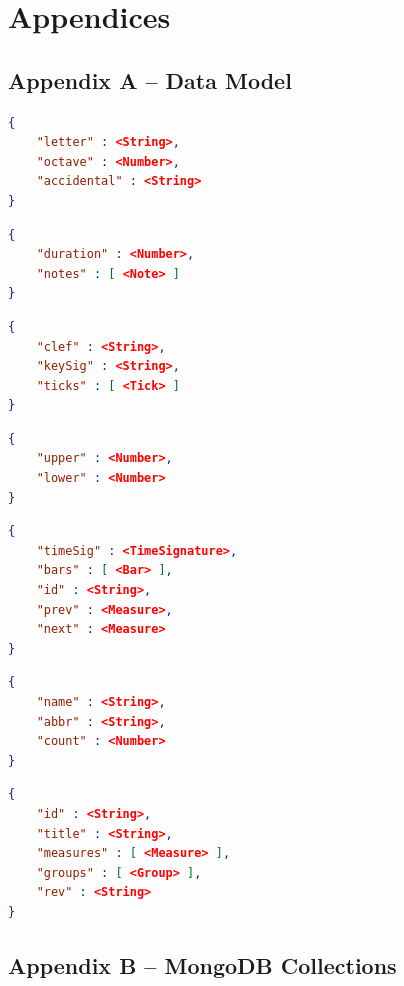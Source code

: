 \documentclass[letterpaper,12pt]{article}
\begin{document}
\newpage

\section{Appendices}

\subsection{Appendix A -- Data Model}

\begin{lstlisting}[language=json, caption=Note]
{
    "letter" : <String>,
    "octave" : <Number>,
    "accidental" : <String>
}
\end{lstlisting}

\begin{lstlisting}[language=json, caption=Tick]
{
    "duration" : <Number>,
    "notes" : [ <Note> ]
}
\end{lstlisting}

\begin{lstlisting}[language=json, caption=Bar]
{
    "clef" : <String>,
    "keySig" : <String>,
    "ticks" : [ <Tick> ]
}
\end{lstlisting}

\begin{lstlisting}[language=json, caption=TimeSignature]
{
    "upper" : <Number>,
    "lower" : <Number>
}
\end{lstlisting}

\begin{lstlisting}[language=json, caption=Measure]
{
    "timeSig" : <TimeSignature>,
    "bars" : [ <Bar> ],
    "id" : <String>,
    "prev" : <Measure>,
    "next" : <Measure>
}
\end{lstlisting}

\begin{lstlisting}[language=json, caption=Group]
{
    "name" : <String>,
    "abbr" : <String>,
    "count" : <Number>
}
\end{lstlisting}

\begin{lstlisting}[language=json, caption=MusicScore]
{
    "id" : <String>,
    "title" : <String>,
    "measures" : [ <Measure> ],
    "groups" : [ <Group> ],
    "rev" : <String>
}
\end{lstlisting}

\subsection{Appendix B -- MongoDB Collections}
\end{document}

